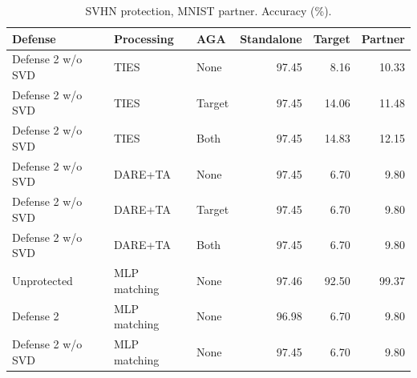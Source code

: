 \begin{table}[t]
\centering\small
\caption{SVHN protection, MNIST partner. Accuracy (\%).}
\begin{tabular}{lllrrr}
\toprule
Defense & Processing & AGA & Standalone & Target & Partner \\
\midrule
Defense 2 w/o SVD & TIES & None & 97.45 & 8.16 & 10.33 \\
Defense 2 w/o SVD & TIES & Target & 97.45 & 14.06 & 11.48 \\
Defense 2 w/o SVD & TIES & Both & 97.45 & 14.83 & 12.15 \\
Defense 2 w/o SVD & DARE+TA & None & 97.45 & 6.70 & 9.80 \\
Defense 2 w/o SVD & DARE+TA & Target & 97.45 & 6.70 & 9.80 \\
Defense 2 w/o SVD & DARE+TA & Both & 97.45 & 6.70 & 9.80 \\
Unprotected & MLP matching & None & 97.46 & 92.50 & 99.37 \\
Defense 2 & MLP matching & None & 96.98 & 6.70 & 9.80 \\
Defense 2 w/o SVD & MLP matching & None & 97.45 & 6.70 & 9.80 \\
\bottomrule
\end{tabular}
\end{table}


